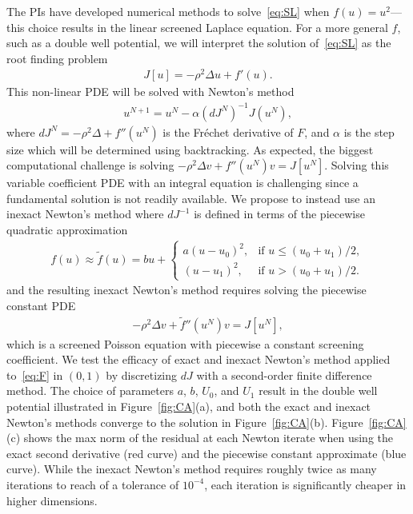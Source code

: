 The PIs have developed numerical methods to solve~\eqref{eq:SL} when
$f(u) = u^2$---this choice results in the linear screened Laplace
equation. For a more general $f$, such as a double well potential, we
will interpret the solution of~\eqref{eq:SL} as the root finding problem
\begin{align}
  \label{eq:F}
  J[u] = -\rho^2 \Delta u + f'(u).
\end{align}
This non-linear PDE will be solved with Newton's method
\begin{align*}
  u^{N+1} = u^{N} - \alpha (dJ^N)^{-1} J(u^N),
\end{align*}
where $dJ^N = -\rho^2 \Delta + f''(u^N)$ is the Fr\'{e}chet derivative
of $F$, and $\alpha$ is the step size which will be determined using
backtracking. As expected, the biggest computational challenge is
solving $- \rho^2 \Delta v + f''(u^{N}) v = J[u^N]$. Solving this
variable coefficient PDE with an integral equation is challenging since
a fundamental solution is not readily available. We propose to instead
use an inexact Newton's method where $dJ^{-1}$ is defined in terms of
the piecewise quadratic approximation
\begin{align*}
  f(u) \approx \tilde{f}(u) = bu + \begin{cases}
    a(u - u_0)^2, &\mbox{if } u \leq (u_0 + u_1)/2, \\
    (u - u_1)^2, &\mbox{if } u > (u_0 + u_1)/2.
  \end{cases}
\end{align*}
and the resulting inexact Newton's method requires solving the piecewise
constant PDE
\begin{align}
  \label{eq:screenedPoisson}
  -\rho^2 \Delta v + \tilde{f}''(u^{N})v = J[u^N],
\end{align}
which is a screened Poisson equation with piecewise a constant screening
coefficient. We test the efficacy of exact and inexact Newton's method
applied to~\eqref{eq:F} in $(0,1)$ by discretizing $dJ$ with a
second-order finite difference method. The choice of parameters $a$,
$b$, $U_0$, and $U_1$ result in the double well potential illustrated in
Figure~\ref{fig:CA}(a), and both the exact and inexact Newton's methods
converge to the solution in Figure~\ref{fig:CA}(b).
Figure~\ref{fig:CA}(c) shows the max norm of the residual at each Newton
iterate when using the exact second derivative (red curve) and the
piecewise constant approximate (blue curve). While the inexact Newton's
method requires roughly twice as many iterations to reach of a tolerance
of $10^{-4}$, each iteration is significantly cheaper in higher
dimensions.

